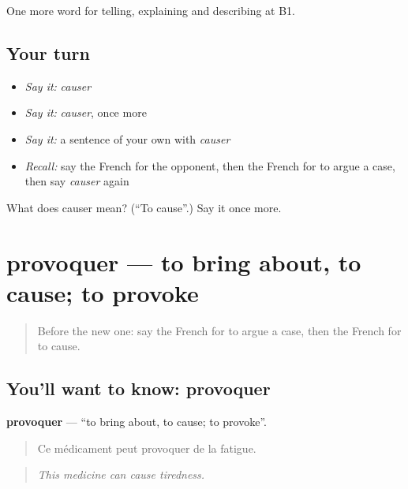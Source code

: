 \begin{grammarlens}[title={What you've built}]
One more word for telling, explaining and describing at B1.
\end{grammarlens}

\subsection*{Your turn}
\begin{itemize}
\raggedright
  \item \emph{Say it:} \emph{causer}
  \item \emph{Say it:} \emph{causer}, once more
  \item \emph{Say it:} a sentence of your own with \emph{causer}
  \item \emph{Recall:} say the French for the opponent, then the French for to argue a case, then say \emph{causer} again
\end{itemize}

\begin{tcolorbox}[breakable,colback=teal!4,colframe=teal!35!black,title={Before you move on}]
What does causer mean? (\textquotedblleft{}To cause\textquotedblright{}.) Say it once more.
\end{tcolorbox}
\section[provoquer]{provoquer — to bring about, to cause; to provoke}

\label{lesson:FR-C346-provoquer}



\begin{quote}
Before the new one: say the French for to argue a case, then the French for to cause.
\end{quote}

\subsection*{You'll want to know: provoquer}
\textbf{provoquer} — \textquotedblleft{}to bring about, to cause; to provoke\textquotedblright{}.

\begin{quote}
Ce médicament peut provoquer de la fatigue.
\end{quote}

\begin{quote}
\emph{This medicine can cause tiredness.}
\end{quote}

